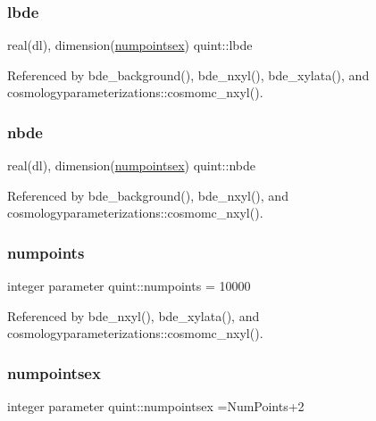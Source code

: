\mbox{\label{namespacequint_aea928c2d627a7d5001dfe09a898d0c21}} 
\subsubsection{\texorpdfstring{lbde}{lbde}}
{\footnotesize\ttfamily real(dl), dimension(\mbox{\hyperlink{namespacequint_a8388814d2fb6e0f54431a7257a8f86a9}{numpointsex}}) quint\+::lbde}



Referenced by bde\+\_\+background(), bde\+\_\+nxyl(), bde\+\_\+xylata(), and cosmologyparameterizations\+::cosmomc\+\_\+nxyl().

\mbox{\label{namespacequint_a772dd6340b969931fd8b4cc796e2ecee}} 
\subsubsection{\texorpdfstring{nbde}{nbde}}
{\footnotesize\ttfamily real(dl), dimension(\mbox{\hyperlink{namespacequint_a8388814d2fb6e0f54431a7257a8f86a9}{numpointsex}}) quint\+::nbde}



Referenced by bde\+\_\+background(), bde\+\_\+nxyl(), and cosmologyparameterizations\+::cosmomc\+\_\+nxyl().

\mbox{\label{namespacequint_ab17aada00a312b3af2e4e191fdf3e50e}} 
\subsubsection{\texorpdfstring{numpoints}{numpoints}}
{\footnotesize\ttfamily integer parameter quint\+::numpoints = 10000}



Referenced by bde\+\_\+nxyl(), bde\+\_\+xylata(), and cosmologyparameterizations\+::cosmomc\+\_\+nxyl().

\mbox{\label{namespacequint_a8388814d2fb6e0f54431a7257a8f86a9}} 
\subsubsection{\texorpdfstring{numpointsex}{numpointsex}}
{\footnotesize\ttfamily integer parameter quint\+::numpointsex =Num\+Points+2}



